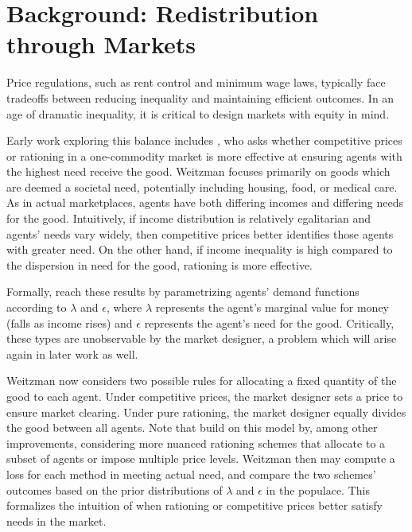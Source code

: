 \documentclass[AER]{AEA}
\begin{document}
\section{Background: Redistribution through Markets}
\label{sec:background-redist}

Price regulations, such as rent control and minimum wage laws, typically face tradeoffs between reducing inequality and maintaining efficient outcomes. In an age of dramatic inequality, it is critical to design markets with equity in mind.

Early work exploring this balance includes \cite{weitzman-1977}, who asks whether competitive prices or rationing in a one-commodity market is more effective at ensuring agents with the highest need receive the good. Weitzman focuses primarily on goods which are deemed a societal need, potentially including housing, food, or medical care. As in actual marketplaces, agents have both differing incomes and differing needs for the good. Intuitively, if income distribution is relatively egalitarian and agents' needs vary widely, then competitive prices better identifies those agents with greater need. On the other hand, if income inequality is high compared to the dispersion in need for the good, rationing is more effective.

Formally, \cite{weitzman-1977} reach these results by parametrizing agents' demand functions according to $\lambda$ and $\epsilon$, where $\lambda$ represents the agent's marginal value for money (falls as income rises) and $\epsilon$ represents the agent's need for the good. Critically, these types are unobservable by the market designer, a problem which will arise again in later work as well.

Weitzman now considers two possible rules for allocating a fixed quantity of the good to each agent. Under competitive prices, the market designer sets a price to ensure market clearing. Under pure rationing, the market designer equally divides the good between all agents. Note that \cite{dworczak-2020} build on this model by, among other improvements, considering more nuanced rationing schemes that allocate to a subset of agents or impose multiple price levels. Weitzman then may compute a loss for each method in meeting actual need, and compare the two schemes' outcomes based on the prior distributions of $\lambda$ and $\epsilon$ in the populace. This formalizes the intuition of when rationing or competitive prices better satisfy needs in the market.
\end{document}
